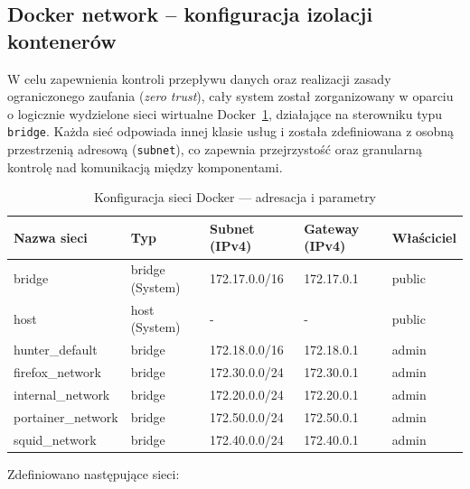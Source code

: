 \documentclass[
    left=2.5cm,         %
    right=2.5cm,        %
    top=2.5cm,          %
    bottom=3cm,         %
    bindingoffset=6mm,  %
    nohyphenation=true %
]{eiti/eiti-thesis} %
\begin{document}
\subsection{Docker network – konfiguracja izolacji kontenerów}

W celu zapewnienia kontroli przepływu danych oraz realizacji zasady ograniczonego zaufania (\textit{zero trust}), cały system został zorganizowany w oparciu o logicznie wydzielone sieci wirtualne Docker~\ref{tab:docker-networks}, działające na sterowniku typu \texttt{bridge}. Każda sieć odpowiada innej klasie usług i została zdefiniowana z osobną przestrzenią adresową (\texttt{subnet}), co zapewnia przejrzystość oraz granularną kontrolę nad komunikacją między komponentami.

\begin{table}[H]
\centering
\caption{Konfiguracja sieci Docker — adresacja i parametry}
\label{tab:docker-networks}
\begin{tabularx}{\textwidth}{|l|l|l|l|X|}
\hline
\textbf{Nazwa sieci} & \textbf{Typ} & \textbf{Subnet (IPv4)} & \textbf{Gateway (IPv4)} & \textbf{Właściciel} \\
\hline
bridge & bridge (System) & 172.17.0.0/16 & 172.17.0.1 & public \\
\hline
host & host (System) & - & - & public \\
\hline
hunter\_default & bridge & 172.18.0.0/16 & 172.18.0.1 & admin \\
\hline
firefox\_network & bridge & 172.30.0.0/24 & 172.30.0.1 & admin \\
\hline
internal\_network & bridge & 172.20.0.0/24 & 172.20.0.1 & admin \\
\hline
portainer\_network & bridge & 172.50.0.0/24 & 172.50.0.1 & admin \\
\hline
squid\_network & bridge & 172.40.0.0/24 & 172.40.0.1 & admin \\
\hline
\end{tabularx}
\end{table}


Zdefiniowano następujące sieci:
\end{document}

